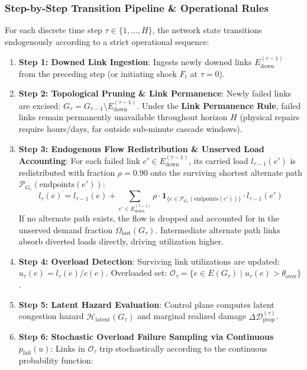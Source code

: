 \documentclass[pdflatex,sn-mathphys-num]{sn-jnl}
\theoremstyle{thmstyleone}
\theoremstyle{thmstyletwo}
\theoremstyle{thmstylethree}
\begin{document}
\subsubsection{Step-by-Step Transition Pipeline \& Operational Rules}
For each discrete time step $\tau \in \{1, \dots, H\}$, the network state transitions endogenously according to a strict operational sequence:
\begin{enumerate}
    \item \textbf{Step 1: Downed Link Ingestion}: Ingests newly downed links $E_{\mathrm{down}}^{(\tau-1)}$ from the preceding step (or initiating shock $F_t$ at $\tau=0$).
    \item \textbf{Step 2: Topological Pruning \& Link Permanence}: Newly failed links are excised: $G_\tau = G_{\tau-1} \setminus E_{\mathrm{down}}^{(\tau-1)}$. Under the \textbf{Link Permanence Rule}, failed links remain permanently unavailable throughout horizon $H$ (physical repairs require hours/days, far outside sub-minute cascade windows).
    \item \textbf{Step 3: Endogenous Flow Redistribution \& Unserved Load Accounting}: For each failed link $e' \in E_{\mathrm{down}}^{(\tau-1)}$, its carried load $l_{\tau-1}(e')$ is redistributed with fraction $\rho = 0.90$ onto the surviving shortest alternate path $\mathcal{P}_{G_\tau}(\mathrm{endpoints}(e'))$:
    \begin{equation}
    l_\tau(e) = l_{\tau-1}(e) + \sum_{e' \in E_{\mathrm{down}}^{(\tau-1)}} \rho \cdot \mathbf{1}_{\{e \in \mathcal{P}_{G_\tau}(\mathrm{endpoints}(e'))\}} \cdot l_{\tau-1}(e')
    \end{equation}
    If no alternate path exists, the flow is dropped and accounted for in the unserved demand fraction $\Omega_{\mathrm{lost}}(G_\tau)$. Intermediate alternate path links absorb diverted loads directly, driving utilization higher.
    \item \textbf{Step 4: Overload Detection}: Surviving link utilizations are updated: $u_\tau(e) = l_\tau(e) / c(e)$. Overloaded set: $\mathcal{O}_\tau = \{ e \in E(G_\tau) \mid u_\tau(e) > \theta_{\mathrm{over}} \}$.
    \item \textbf{Step 5: Latent Hazard Evaluation}: Control plane computes latent congestion hazard $\mathcal{H}_{\mathrm{latent}}(G_\tau)$ and marginal realized damage $\Delta \mathcal{D}_{\mathrm{prop}}^{(\tau)}$.
    \item \textbf{Step 6: Stochastic Overload Failure Sampling via Continuous $p_{\mathrm{fail}}(u)$}:
    Links in $\mathcal{O}_\tau$ trip stochastically according to the continuous probability function:

\end{enumerate}
\end{document}
